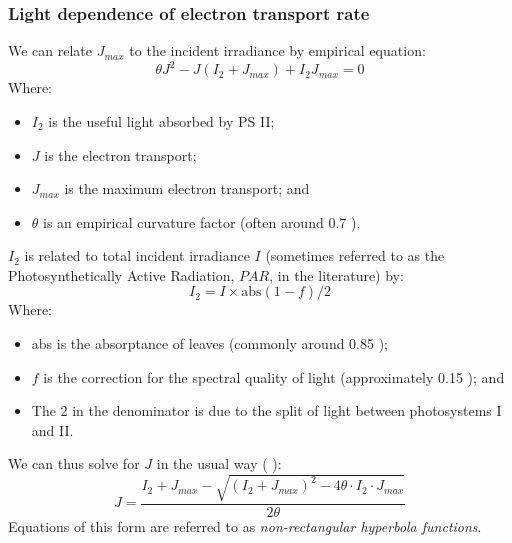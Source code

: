 \documentclass[11pt]{article} %
\begin{document}
\subsubsection{Light dependence of electron transport rate}
We can relate $J_{max}$ to the incident irradiance by empirical equation:
\begin{equation} \label{J_J_max_relationship}
 \theta J^2 - J\left (I_2 + J_{max}\right ) + I_2J_{max} = 0
\end{equation}
Where:
\begin{itemize}
 \item $I_2$ is the useful light absorbed by PS II;
 \item $J$ is the electron transport;
 \item $J_{max}$ is the maximum electron transport; and
 \item $\theta$ is an empirical curvature factor (often around 0.7 \cite{EvansPhotosynthesisnitrogenrelationships1989}).
\end{itemize}
$I_2$ is related to total incident irradiance $I$ (sometimes referred to as the Photosynthetically Active Radiation, $PAR$, in the literature) by:
\begin{equation}
I_2 = I \times \textrm{abs}(1-f)/2
\end{equation}
Where:
\begin{itemize}
 \item abs is the absorptance of leaves (commonly around 0.85 \cite{CaemmererBiochemicalmodelsleaf2000});
 \item $f$ is the correction for the spectral quality of light (approximately 0.15 \cite{EvansDependenceQuantumYield1987}); and
 \item The 2 in the denominator is due to the split of light between photosystems I and II.
\end{itemize}
We can thus solve for $J$ in the usual way (\cite{QianEstimationphotosynthesisparameters2012} \cite{YinC3C4photosynthesis2009}):
\begin{equation} \label{nonrectangular_hyperbola}
J = \frac{I_2 + J_{max} - \sqrt{\left ( I_2 + J_{max}\right )^2 - 4\theta \cdot I_2 \cdot J_{max}}}{2 \theta}
\end{equation}
Equations of this form are referred to as \emph{non-rectangular hyperbola functions}.
\end{document}
